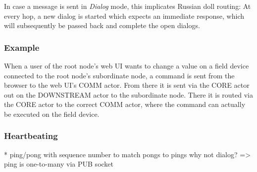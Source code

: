 In case a message is sent in \emph{Dialog} mode, this implicates Russian doll
routing: At every hop, a new dialog is started which expects an immediate
response, which will subsequently be passed back and complete the open dialogs.


%
%

%


\subsubsection{Example}
When a user of the root node's web UI wants to change a value on a field device
connected to the root node's subordinate node, a command is sent from the
browser to the web UI's COMM actor. From there it is sent via the CORE actor out
on the DOWNSTREAM actor to the subordinate node. There it is routed
via the CORE actor to the correct COMM actor, where the command can actually be
executed on the field device.

\subsubsection{Heartbeating}
* ping/pong with sequence number to match pongs to pings
  why not dialog? => ping is one-to-many via PUB socket


